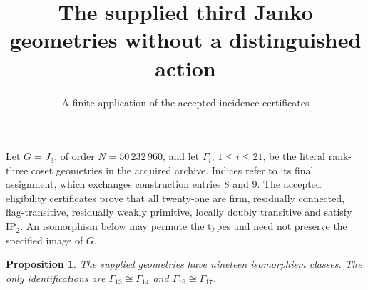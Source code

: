 \documentclass[11pt]{article}
\title{The supplied third Janko geometries without a distinguished action}
\author{A finite application of the accepted incidence certificates}\date{}
\newtheorem{proposition}{Proposition}
\begin{document}
\maketitle
Let $G=J_3$, of order $N=50\,232\,960$, and let $\Gamma_i$, $1\leq i\leq21$,
be the literal rank-three coset geometries in the acquired archive.
Indices refer to its final assignment, which exchanges construction entries
$8$ and $9$. The accepted eligibility certificates prove that all twenty-one
are firm, residually connected, flag-transitive, residually weakly primitive,
locally doubly transitive and satisfy $\mathrm{IP}_2$.
An isomorphism below may permute the types and need not preserve the
specified image of $G$.

\begin{proposition}
The supplied geometries have nineteen isomorphism classes.
The only identifications are $\Gamma_{13}\cong\Gamma_{14}$ and
$\Gamma_{16}\cong\Gamma_{17}$.
\end{proposition}
\end{document}
